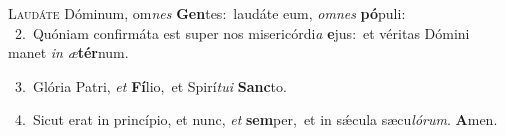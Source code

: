 \lettrine{\initial\textcolor{\initialcolor}{L}}{audáte} Dóminum, om\textit{nes} \textbf{Gen}\-tes:~\star laudáte eum, \textit{om}\-\textit{nes} \textbf{pó}\-puli:\\
{\numbfont\textcolor{\numbcolor}{~2.}}~Quóniam confirmáta est super nos misericórdi\textit{a} \textbf{e}\-jus:~\star et véritas Dómini manet \textit{in} \textit{æ}\-\textbf{tér}num.\par
{\numbfont\textcolor{\numbcolor}{~3.}}~Glória Patri, \textit{et} \textbf{Fí}\-lio,~\star et Spirí\-\textit{tu}\-\textit{i} \textbf{Sanc}\-to.\par
{\numbfont\textcolor{\numbcolor}{~4.}}~Sicut erat in princípio, et nunc, \textit{et} \textbf{sem}\-per,~\star et in sǽcula sæcu\-\textit{ló}\-\textit{rum}. \textbf{A}\-men.\par
